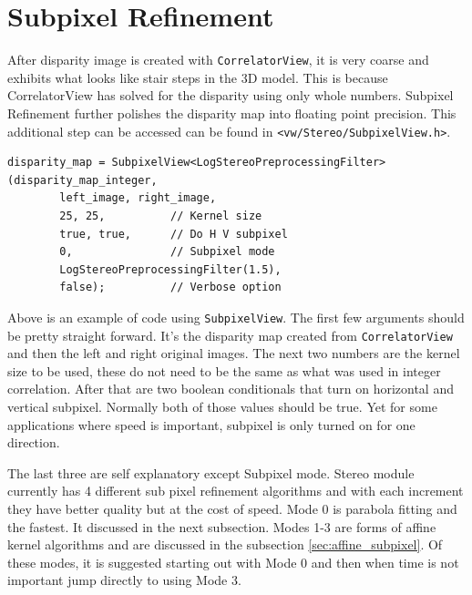 \section{Subpixel Refinement}
\label{sec:subpixel_refinement}

After disparity image is created with {\tt CorrelatorView}, it is very
coarse and exhibits what looks like stair steps in the 3D model. This
is because CorrelatorView has solved for the disparity using only
whole numbers. Subpixel Refinement further polishes the disparity map
into floating point precision. This additional step can be accessed
can be found in {\tt <vw/Stereo/SubpixelView.h>}.

\begin{verbatim}
disparity_map = SubpixelView<LogStereoPreprocessingFilter>(disparity_map_integer,
        left_image, right_image,
        25, 25,          // Kernel size
        true, true,      // Do H V subpixel
        0,               // Subpixel mode
        LogStereoPreprocessingFilter(1.5),
        false);          // Verbose option
\end{verbatim}

Above is an example of code using {\tt SubpixelView}. The first few
arguments should be pretty straight forward. It's the disparity map
created from {\tt CorrelatorView} and then the left and right original
images. The next two numbers are the kernel size to be used, these do
not need to be the same as what was used in integer correlation. After
that are two boolean conditionals that turn on horizontal and vertical
subpixel. Normally both of those values should be true. Yet for some
applications where speed is important, subpixel is only turned on for
one direction.

The last three are self explanatory except Subpixel mode. Stereo
module currently has 4 different sub pixel refinement algorithms and
with each increment they have better quality but at the cost of
speed. Mode 0 is parabola fitting and the fastest. It discussed in the
next subsection. Modes 1-3 are forms of affine kernel algorithms and
are discussed in the subsection \ref{sec:affine_subpixel}. Of these
modes, it is suggested starting out with Mode 0 and then when time is
not important jump directly to using Mode 3.

